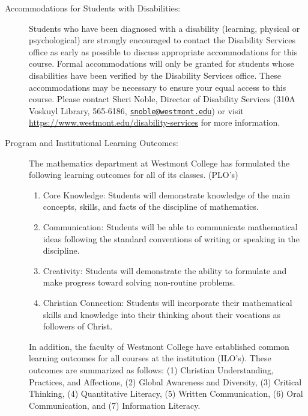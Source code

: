 \documentclass[
  twoside]{article}
\begin{document}
\begin{description}
\item[Accommodations for Students with Disabilities:] Students who have been diagnosed with a disability (learning, physical or psychological) are strongly encouraged to contact the Disability Services office as early as possible to discuss appropriate accommodations for this course. Formal accommodations will only be granted for students whose disabilities have been verified by the Disability Services office.  These accommodations may be necessary to ensure your equal access to this course.  Please contact Sheri Noble, Director of Disability Services (310A Voskuyl Library, 565-6186, \href{mailto:snoble@westmont.edu}{\tt snoble@westmont.edu}) or visit \url{https://www.westmont.edu/disability-services} for more information.

\item[Program and Institutional Learning Outcomes:] The
         mathematics department at Westmont College has formulated the
         following learning outcomes for all of its classes. (PLO's)
\begin{enumerate}[noitemsep]
\item Core Knowledge: Students will demonstrate knowledge of the
                  main concepts, skills, and facts of the discipline of
                  mathematics.
\item Communication: Students will be able to communicate mathematical ideas
     following the standard conventions of writing or speaking in the
     discipline.
\item Creativity: Students will demonstrate the ability to formulate and make
     progress toward solving non-routine problems.
\item Christian Connection: Students will incorporate their mathematical skills
     and knowledge into their thinking about their vocations as followers of
     Christ.
         \end{enumerate}
         In addition, the faculty of Westmont College have established common
         learning outcomes for all courses at the institution
         (ILO's). These outcomes are summarized as follows:
(1) Christian Understanding, Practices, and Affections,
(2) Global Awareness and Diversity,
(3) Critical Thinking,
(4) Quantitative Literacy,
(5) Written Communication,
(6) Oral Communication, and
(7) Information Literacy.


\end{description}
\end{document}
